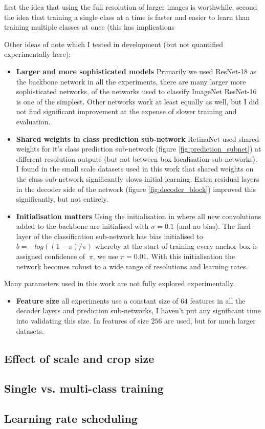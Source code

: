 first the idea that using the full resolution of larger images is worthwhile, second the idea that training a single class at a time is faster and easier to learn than training multiple classes at once (this has implications 


Other ideas of note which I tested in development (but not quantified experimentally here):

\begin{itemize}
    \item {\bf Larger and more sophisticated models}
Primarily we used ResNet-18 \cite{He2015} as the backbone network in all the experiments, there are many larger more sophisticated networks, of the networks used to classify ImageNet ResNet-16 is one of the simplest. Other networks work at least equally as well, but I did not find significant improvement at the expense of slower training and evaluation.
    \item {\bf Shared weights in class prediction sub-network}
RetinaNet \cite{Lin2017} used shared weights for it's class prediction sub-network (figure \ref{fig:prediction_subnet}) at different resolution outputs (but not between box localisation sub-networks). I found in the small scale datasets used in this work that shared weights on the class sub-network significantly slows initial learning. Extra residual layers in the decoder side of the network (figure \ref{fig:decoder_block}) improved this significantly, but not entirely.
    \item {\bf Initialisation matters}
Using the initialisation in \cite{Lin2017} where all new convolutions added to the backbone are initialised with $\sigma=0.1$ (and no bias). The final layer of the classification sub-network has bias initialised to $b = −log((1 − \pi)/\pi) $ whereby at the start of training every anchor box is assigned confidence of $~\pi$, we use $\pi=0.01$. With this initialisation the network becomes robust to a wide range of resolutions and learning rates.

\end{itemize}

Many parameters used in this work are not fully explored experimentally.

\begin{itemize}
    \item {\bf Feature size}
all experiments use a constant size of $64$ features in all the decoder layers and prediction sub-networks, I haven't put any significant time into validating this size. In \cite{Lin2017} features of size $256$ are used, but for much larger datasets.     
\end{itemize}


\subsection {Effect of scale and crop size}



\subsection {Single vs. multi-class training}


\subsection {Learning rate scheduling}